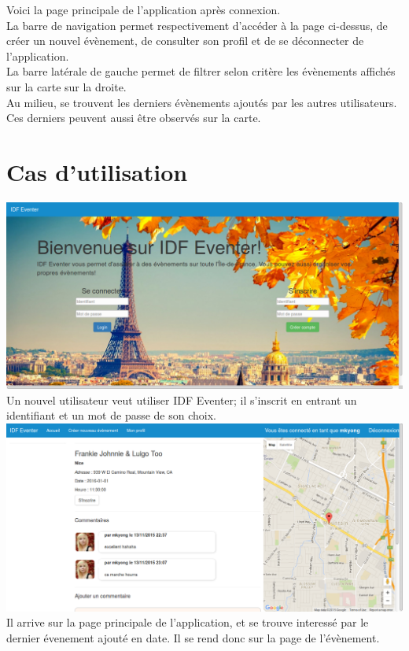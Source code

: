 \documentclass[11pt,a4paper,margin=0.5in]{report}
\begin{document}
Voici la page principale de l'application après connexion.\\
La barre de navigation permet respectivement d'accéder à la page ci-dessus, de créer un nouvel évènement, de consulter son profil et de se déconnecter
de l'application.\\

La barre latérale de gauche permet de filtrer selon critère les évènements affichés sur la carte sur la droite.\\
Au milieu, se trouvent les derniers évènements ajoutés par les autres utilisateurs. Ces derniers peuvent aussi être observés sur la carte.

\clearpage

\section{Cas d'utilisation}

\includegraphics[scale=0.33]{illus/home.png} \\[0.25in]

Un nouvel utilisateur veut utiliser IDF Eventer; il s'inscrit en entrant un identifiant et un mot de passe de son choix. \\[0.25in]

\includegraphics[scale=0.33]{illus/event.png} \\[0.25in]
Il arrive sur la page principale de l'application, et se trouve interessé par le dernier évenement ajouté en date. Il se rend donc sur la page de l'évènement. \\
\end{document}
